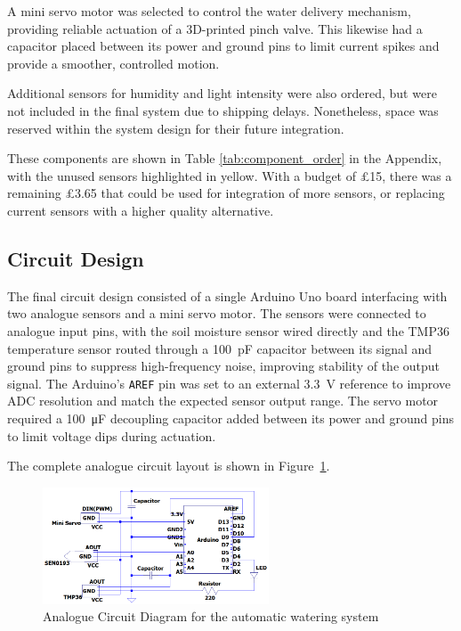 \documentclass[a4paper,11pt]{article}
\begin{document}
A mini servo motor was selected to control the water delivery mechanism, 
providing reliable actuation of a 3D-printed pinch valve.
This likewise had a capacitor placed between its power and ground pins 
to limit current spikes and provide a smoother, controlled motion.

Additional sensors for humidity and light intensity were also ordered, 
but were not included in the final system due to shipping delays. 
Nonetheless, space was reserved within the system design 
for their future integration.

These components are shown in Table \ref{tab:component_order} in the Appendix,
with the unused sensors highlighted in yellow.
With a budget of £15, there was a remaining £3.65 
that could be used for integration of more sensors,
or replacing current sensors with a higher quality alternative.

\subsection{Circuit Design}
\label{sec:circuit_design}

The final circuit design consisted of a single Arduino Uno board interfacing 
with two analogue sensors and a mini servo motor. The sensors were connected 
to analogue input pins, with the soil moisture sensor wired directly and the 
TMP36 temperature sensor routed through a \SI{100}{\pico\farad} capacitor 
between its signal and ground pins to suppress high-frequency noise,
improving stability of the output signal. 
The Arduino's \texttt{AREF} pin was set to an external \SI{3.3}{\volt} reference 
to improve ADC resolution and match the expected sensor output range.
The servo motor required a \SI{100}{\micro\farad} decoupling capacitor added between 
its power and ground pins to limit voltage dips during actuation.

The complete analogue circuit layout is shown in 
Figure~\ref{fig:Analogue_Circuit_Diagram_for_the_automatic_watering_system}.

\begin{figure}[H]
    \centering
    \includegraphics[width=0.6\textwidth]{Analogue Circuit Diagram - final.png}
    \caption{Analogue Circuit Diagram for the automatic watering system}
    \label{fig:Analogue_Circuit_Diagram_for_the_automatic_watering_system}
\end{figure}
\end{document}
